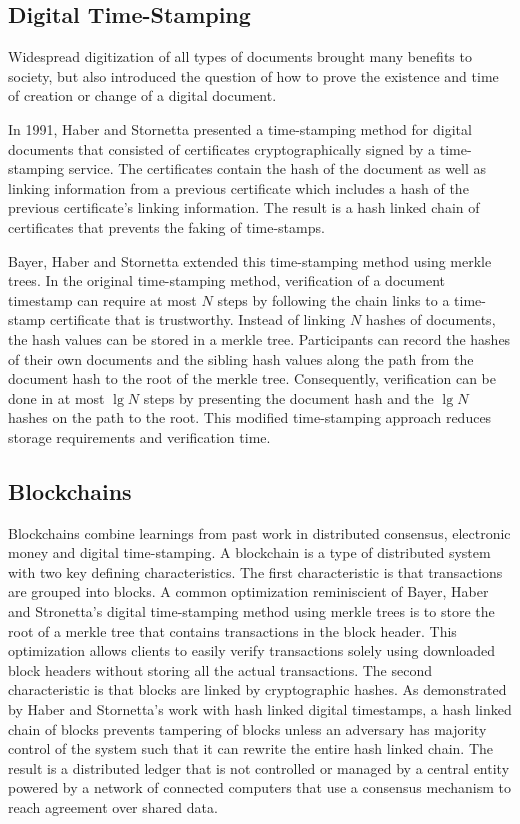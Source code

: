 \subsection{Digital Time-Stamping}

Widespread digitization of all types of documents brought many benefits to
society, but also introduced the question of how to prove the existence and time of creation or change of a
digital document.

In 1991, Haber and Stornetta presented a time-stamping method for digital
documents that consisted of certificates cryptographically signed by a time-stamping service. The
certificates contain the hash of the document as well as linking information from a
previous certificate which includes a hash of the previous certificate's linking
information\cite{haber1991}. The result is a hash linked chain of certificates
that prevents the faking of time-stamps.

Bayer, Haber and Stornetta extended this time-stamping method using merkle
trees. In the original time-stamping method, verification of a document
timestamp can require at most $N$ steps by following the chain links to a
time-stamp certificate that is trustworthy\cite{bayer1993}. Instead of linking $N$
hashes of documents, the hash values can be stored in a merkle tree.
Participants can record the hashes of their own documents and the sibling hash
values along the path from the document hash to the root of the merkle tree.
Consequently, verification can be done in at most $\lg N$ steps by presenting the
document hash and the $\lg N$ hashes on the path to the root. This modified
time-stamping approach reduces storage requirements and verification time.

\subsection{Blockchains}
\label{sec:blockchains}

Blockchains combine learnings from past work in distributed consensus,
electronic money and digital time-stamping. A blockchain is a type of distributed system with two key defining
characteristics. The first characteristic is that transactions are grouped into blocks. A
common optimization reminiscient of Bayer, Haber and
Stronetta's digital time-stamping method using merkle trees is to store the root of a merkle tree that contains
transactions in the block header. This optimization allows clients to easily
verify transactions solely using downloaded block headers without storing all
the actual transactions. The second characteristic is that blocks
are linked by cryptographic hashes. As demonstrated by Haber and Stornetta's
work with hash linked digital timestamps, a hash linked chain of blocks prevents
tampering of blocks unless an adversary has majority control of the system such
that it can rewrite the entire hash linked chain. The result is a distributed ledger that is not controlled or managed by a
central entity powered by a network of connected computers that use a consensus
mechanism to reach agreement over shared data\cite{whatisblockchain}.

